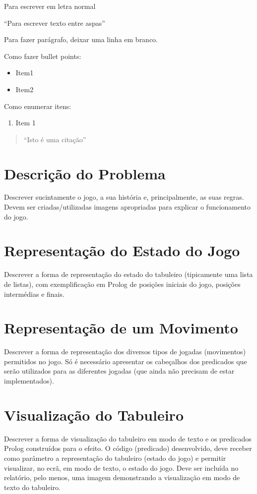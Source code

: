 \documentclass[15pt,a4paper]{article}
\begin{document}
Para escrever em letra normal

``Para escrever texto entre aspas''

Para fazer parágrafo, deixar uma linha em branco.

Como fazer bullet points:

\begin{itemize}
\item Item1
\item Item2
\end{itemize}

Como enumerar itens:

\begin{enumerate}
\item Item 1
\end{enumerate}

\begin{quote}``Isto é uma citação''\end{quote}

\section{Descrição do Problema}
Descrever sucintamente o jogo, a sua história e, principalmente, as suas regras. Devem ser criadas/utilizadas imagens apropriadas para explicar o funcionamento do jogo.

\section{Representação do Estado do Jogo}
Descrever a forma de representação do estado do tabuleiro (tipicamente uma lista de listas), com exemplificação em Prolog de posições iniciais do jogo, posições intermédias e finais.

\section{Representação de um Movimento}
Descrever a forma de representação dos diversos tipos de jogadas (movimentos) permitidos no jogo. Só é necessário apresentar os cabeçalhos dos predicados que serão utilizados para as diferentes jogadas (que ainda não precisam de estar implementados).

\section{Visualização do Tabuleiro}
Descrever a forma de visualização do tabuleiro em modo de texto e os predicados Prolog construídos para o efeito. O código (predicado) desenvolvido, deve receber como parâmetro a representação do tabuleiro (estado do jogo) e permitir visualizar, no ecrã, em modo de texto, o estado do jogo. Deve ser incluída no relatório, pelo menos, uma imagem demonstrando a visualização em modo de texto do tabuleiro.
\end{document}
